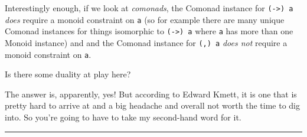 \documentclass[]{article}
\begin{document}
Interestingly enough, if we look at \emph{comonads}, the Comonad instance for
\texttt{(-\textgreater{})\ a} \emph{does} require a monoid constraint on
\texttt{a} (so for example there are many unique Comonad instances for things
isomorphic to \texttt{(-\textgreater{})\ a} where \texttt{a} has more than one
Monoid instance) and and the Comonad instance for \texttt{(,)\ a} \emph{does
not} require a monoid constraint on \texttt{a}.

Is there some duality at play here?

The answer is, apparently, yes! But according to Edward Kmett, it is one that is
pretty hard to arrive at and a big headache and overall not worth the time to
dig into. So you're going to have to take my second-hand word for it.

\begin{center}\rule{0.5\linewidth}{\linethickness}\end{center}
\end{document}
